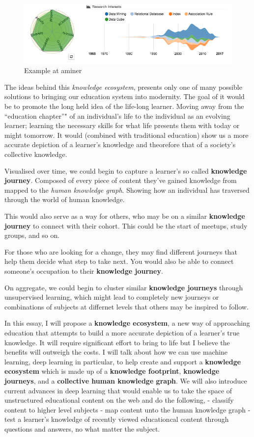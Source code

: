 \documentclass[]{book}
\theoremstyle{definition}
\theoremstyle{definition}
\theoremstyle{definition}
\theoremstyle{remark}
\begin{document}
\begin{figure}
\centering
\includegraphics{img/aminer.png}
\caption{Example at aminer}
\end{figure}

The ideas behind this \emph{knowledge ecosystem}, presents only one of
many possible solutions to bringing our education system into modernity.
The goal of it would be to promote the long held idea of the life-long
learner. Moving away from the ``education chapter''" of an individual's
life to the individual as an evolving learner; learning the necessary
skills for what life presents them with today or might tomorrow. It
would (combined with traditional education) show us a more accurate
depiction of a learner's knowledge and theorefore that of a society's
collective knowledge.

Visualised over time, we could begin to capture a learner's so called
\textbf{knowledge journey}. Composed of every piece of content they've
gained knowledge from mapped to the \emph{human knowledge graph}.
Showing how an individual has traversed through the world of human
knowledge.

This would also serve as a way for others, who may be on a similar
\textbf{knowledge journey} to connect with their cohort. This could be
the start of meetups, study groups, and so on.

For those who are looking for a change, they may find different journeys
that help them decide what step to take next. You would also be able to
connect someone's occupation to their \textbf{knowledge journey}.

On aggregate, we could begin to cluster similar \textbf{knowledge
journeys} through unsupervised learning, which might lead to completely
new journeys or combinations of subjects at differnet levels that others
may be inspired to follow.

In this essay, I will propose a \textbf{knowledge ecosystem}, a new way
of approaching education that attempts to build a more accurate
depiction of a learner's true knowledge. It will require significant
effort to bring to life but I believe the benefits will outweigh the
costs. I will talk about how we can use machine learning, deep learning
in particular, to help create and support a \textbf{knowledge ecosystem}
which is made up of a \textbf{knowledge footprint}, \textbf{knowledge
journeys}, and a \textbf{collective human knowledge graph}. We will also
introduce current advances in deep learning that would enable us to take
the space of unstructured educational content on the web and do the
following, - classify content to higher level subjects - map content
unto the human knowledge graph - test a learner's knowledge of recently
viewed educationcal content through questions and answers, no what
matter the subject.
\end{document}
